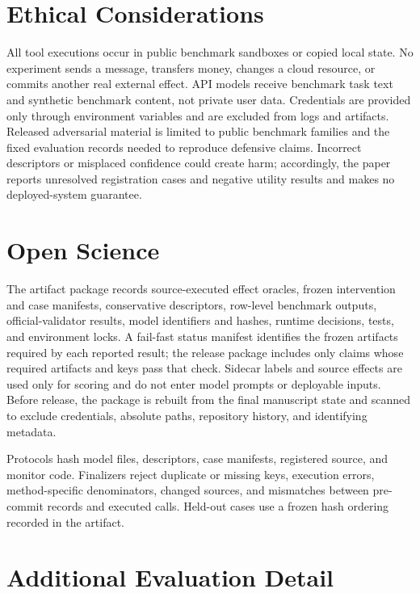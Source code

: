 \documentclass[letterpaper,twocolumn,10pt]{article}
\theoremstyle{definition}
\begin{document}



\appendix
\section{Ethical Considerations}

All tool executions occur in public benchmark sandboxes or copied local state.
No experiment sends a message, transfers money, changes a cloud resource, or
commits another real external effect.  API models receive benchmark task text
and synthetic benchmark content, not private user data.  Credentials are
provided only through environment variables and are excluded from logs and
artifacts.  Released adversarial material is limited to public benchmark
families and the fixed evaluation records needed to reproduce defensive
claims.  Incorrect descriptors or misplaced confidence could create harm;
accordingly, the paper reports unresolved registration cases and negative
utility results and makes no deployed-system guarantee.

\section{Open Science}
\label{app:open-science}

The artifact package records source-executed effect oracles, frozen intervention
and case manifests, conservative descriptors, row-level benchmark outputs,
official-validator results, model identifiers and hashes, runtime decisions,
tests, and environment locks.  A fail-fast status manifest identifies the
frozen artifacts required by each reported result; the release package includes
only claims whose required artifacts and keys pass that check.  Sidecar labels
and source effects are used only for scoring and do not enter model prompts or
deployable inputs.  Before release, the package is rebuilt from the final
manuscript state and scanned to exclude credentials, absolute paths, repository
history, and identifying metadata.

Protocols hash model files, descriptors, case manifests, registered source, and
monitor code.  Finalizers reject duplicate or missing keys, execution errors,
method-specific denominators, changed sources, and mismatches between
pre-commit records and executed calls.  Held-out cases use a frozen hash
ordering recorded in the artifact.

\section{Additional Evaluation Detail}
\label{app:additional-results}
\end{document}
